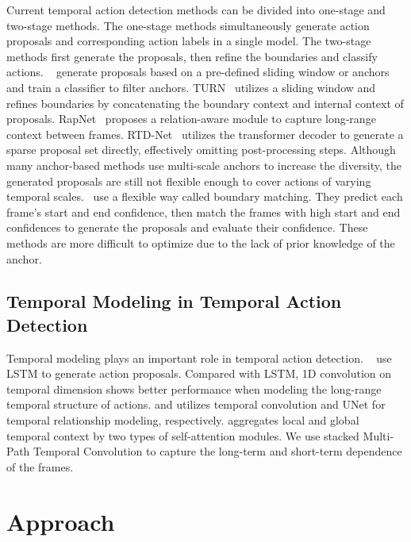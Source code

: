 \documentclass[letterpaper]{article} \usepackage{aaai22}  \usepackage{times}  \usepackage{helvet}  \usepackage{courier}  \usepackage[hyphens]{url}  \usepackage{graphicx} \urlstyle{rm} \def\UrlFont{\rm}  \usepackage{natbib}  \usepackage{caption} \DeclareCaptionStyle{ruled}{labelfont=normalfont,labelsep=colon,strut=off} \frenchspacing  \setlength{\pdfpagewidth}{8.5in}  \setlength{\pdfpageheight}{11in}  \usepackage{algorithm}
\begin{document}
Current temporal action detection methods can be divided into one-stage and two-stage methods. The one-stage methods simultaneously generate action proposals and corresponding action labels in a single model. The two-stage methods first generate the proposals, then refine the boundaries and classify actions. ~\cite{turn,rapnet,talnet} generate proposals based on a pre-defined sliding window or anchors and train a classifier to filter anchors.  TURN~\cite{turn} utilizes a sliding window and refines boundaries by concatenating the boundary context and internal context of proposals. RapNet~\cite{rapnet} proposes a relation-aware module to capture long-range context between frames. RTD-Net~\cite{rtd} utilizes the transformer decoder to generate a sparse proposal set directly, effectively omitting post-processing steps. Although many anchor-based methods use multi-scale anchors to increase the diversity, the generated proposals are still not flexible enough to cover actions of varying temporal scales.~\cite{bsn,bmn,bsn++} use a flexible way called boundary matching. They predict each frame's start and end confidence, then match the frames with high start and end confidences to generate the proposals and evaluate their confidence. These methods are more difficult to optimize due to the lack of prior knowledge of the anchor.



\subsection{Temporal Modeling in Temporal Action Detection}
Temporal modeling plays an important role in temporal action detection. ~\cite{daps,e2e} use LSTM to generate action proposals. Compared with LSTM, 1D convolution on temporal dimension shows better performance when modeling the long-range temporal structure of actions. \cite{LeaFVRH17,tsanet} and \cite{bsn++}  utilizes temporal convolution and UNet for temporal relationship modeling, respectively. \cite{tcanet} aggregates local and global temporal context by two types of self-attention modules. We use stacked Multi-Path Temporal Convolution to capture the long-term and short-term dependence of the frames.











\section{Approach}
\end{document}
